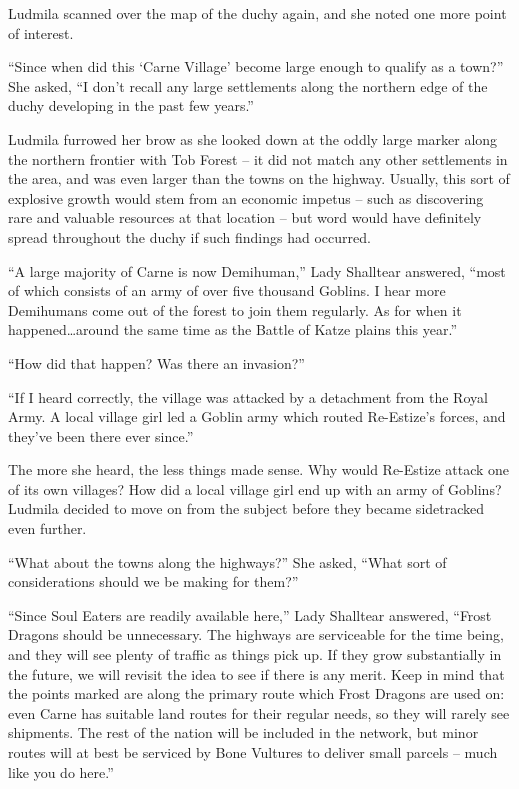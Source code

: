  

Ludmila scanned over the map of the duchy again, and she noted one more point of interest.

 

“Since when did this ‘Carne Village’ become large enough to qualify as a town?” She asked, “I don’t recall any large settlements along the northern edge of the duchy developing in the past few years.”

 

Ludmila furrowed her brow as she looked down at the oddly large marker along the northern frontier with Tob Forest – it did not match any other settlements in the area, and was even larger than the towns on the highway. Usually, this sort of explosive growth would stem from an economic impetus – such as discovering rare and valuable resources at that location – but word would have definitely spread throughout the duchy if such findings had occurred.

 

“A large majority of Carne is now Demihuman,” Lady Shalltear answered, “most of which consists of an army of over five thousand Goblins. I hear more Demihumans come out of the forest to join them regularly. As for when it happened…around the same time as the Battle of Katze plains this year.”

 

“How did that happen? Was there an invasion?”

 

“If I heard correctly, the village was attacked by a detachment from the Royal Army. A local village girl led a Goblin army which routed Re-Estize’s forces, and they’ve been there ever since.”

 

The more she heard, the less things made sense. Why would Re-Estize attack one of its own villages? How did a local village girl end up with an army of Goblins? Ludmila decided to move on from the subject before they became sidetracked even further.

 

“What about the towns along the highways?” She asked, “What sort of considerations should we be making for them?”

 

“Since Soul Eaters are readily available here,” Lady Shalltear answered, “Frost Dragons should be unnecessary. The highways are serviceable for the time being, and they will see plenty of traffic as things pick up. If they grow substantially in the future, we will revisit the idea to see if there is any merit. Keep in mind that the points marked are along the primary route which Frost Dragons are used on: even Carne has suitable land routes for their regular needs, so they will rarely see shipments. The rest of the nation will be included in the network, but minor routes will at best be serviced by Bone Vultures to deliver small parcels – much like you do here.”

